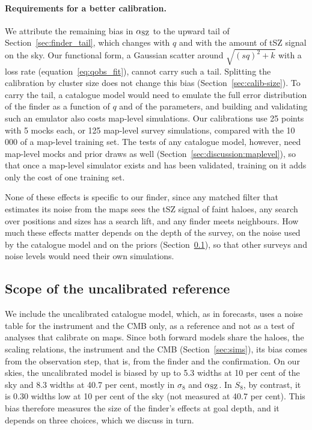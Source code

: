 \paragraph*{Requirements for a better calibration.} We attribute the remaining bias in $\alpha_\mathrm{SZ}$ to the
upward tail of Section~\ref{sec:finder_tail}, which changes with $q$ and with the amount of tSZ signal on the
sky. Our functional form, a Gaussian scatter around $\sqrt{(sq)^2+k}$ with a loss rate
(equation~\ref{eq:qobs_fit}), cannot carry such a tail. Splitting the calibration by cluster size does not change
this bias (Section~\ref{sec:calib-size}). To carry the tail, a catalogue model would need to emulate the
full error distribution of the finder as a function of $q$ and of the parameters, and building and
validating such an emulator also costs map-level simulations. Our calibrations use 25 points with 5 mocks
each, or 125 map-level survey simulations, compared with the 10\,000 of a map-level training set. The tests of
any catalogue model, however, need map-level mocks and prior draws as well
(Section~\ref{sec:discussion:maplevel}), so that once a map-level simulator exists and has been validated,
training on it adds only the cost of one training set.

None of these effects is specific to our finder, since any matched filter that estimates its noise from the
maps sees the tSZ signal of faint haloes, any search over positions and sizes has a search lift, and any
finder meets neighbours. How much these effects matter depends on the depth of the survey, on the noise
used by the catalogue model and on the priors (Section~\ref{sec:discussion:scope}), so that other surveys
and noise levels would need their own simulations.

\subsection{Scope of the uncalibrated reference}\label{sec:discussion:scope}

We include the uncalibrated catalogue model, which, as in forecasts, uses a noise table for the instrument
and the CMB only, as a reference and not as a test of analyses that calibrate on maps. Since both
forward models share the haloes, the scaling relations, the instrument and the CMB
(Section~\ref{sec:sims}), its bias comes from the observation step, that is, from the finder and the
confirmation. On our skies, the uncalibrated model is biased by up to 5.3 widths at 10 per cent of the sky
and 8.3 widths at 40.7 per cent, mostly in $\sigma_8$ and $\alpha_\mathrm{SZ}$. In $S_8$, by contrast, it is 0.30 widths
low at 10 per cent of the sky (not measured at 40.7 per cent). This bias therefore measures the size of the
finder's effects at goal depth, and it depends on three choices, which we discuss in turn.

